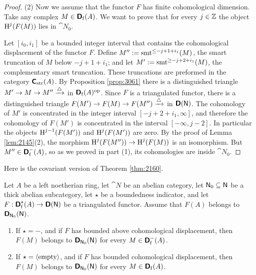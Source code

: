 \begin{proof}
\medskip \noindent
(2) Now we assume that the functor $F$ has finite cohomological dimension. Take 
any complex $M \in \boldsymbol{\mathsf{D}}_{\mathrm{f}}(A)$. We want to prove 
that for every $j \in \mathbb{Z}$ the object $\operatorname{H}^j(F(M))$ lies in $\cat{N}_0$. 

Let $[i_0, i_1]$ be a bounded integer interval that contains the 
cohomological displacement of the functor $F$. 
Define $M'' := \operatorname{smt}^{\leq - j + 1 + i_1}(M)$, the smart truncation of $M$ 
below $-j + 1 + i_1$; and let $M' := \operatorname{smt}^{\geq -j + 2 + i_1}(M)$, the 
complementary smart truncation. These truncations are preformed in the category 
$\boldsymbol{\mathsf{C}}_{\mathrm{str}}(A)$. 
By Proposition \ref{prop:3061} there is a distinguished triangle 
$M' \to M \to M'' \xrightarrow{\triangle}$ 
in $\boldsymbol{\mathsf{D}}_{\mathrm{f}}(A)^{\mathrm{op}}$.
Since $F$ is a triangulated functor, there is a distinguished triangle 
$F(M') \to F(M) \to F(M'') \xrightarrow{\triangle}$ 
in $\boldsymbol{\mathsf{D}}(\operatorname{\mathsf{N}})$.
The cohomology of $M'$ is concentrated in the integer
interval $[- j + 2 + i_1, \infty]$, and therefore the cohomology of 
$F(M')$ is concentrated in the interval $[- \infty, j - 2]$. 
In particular the objects $\operatorname{H}^{j - 1}(F(M'))$ and 
$\operatorname{H}^{j}(F(M'))$ are zero.
By the proof of Lemma \ref{lem:2145}(2), the morphism 
$\operatorname{H}^j(F(M'')) \to \operatorname{H}^j(F(M))$ is an isomorphism.
But $M'' \in \boldsymbol{\mathsf{D}}^-_{\mathrm{f}}(A)$, so as we proved in part (1), its 
cohomologies are inside $\cat{N}_0$. 
\end{proof}

Here is the covariant version of Theorem \ref{thm:2160}.

\begin{thm} \label{thm:4600} 
Let $A$ be a left noetherian ring, let $\cat{N}$ be an abelian category, let
$\operatorname{\mathsf{N}}_0 \subseteq \operatorname{\mathsf{N}}$ be a thick abelian subcategory, let $\star$ be a 
boundedness indicator, and let 
$F : \boldsymbol{\mathsf{D}}^{\star}_{\mathrm{f}}(A) \to \boldsymbol{\mathsf{D}}(\operatorname{\mathsf{N}})$
be a triangulated functor. Assume that 
$F(A)$ belongs to $\boldsymbol{\mathsf{D}}_{\operatorname{\mathsf{N}}_0}(\operatorname{\mathsf{N}})$.
\begin{enumerate}
\item If $\star = -$, and if $F$ has bounded above cohomological displacement, 
then $F(M)$ belongs to $\boldsymbol{\mathsf{D}}_{\operatorname{\mathsf{N}}_0}(\operatorname{\mathsf{N}})$
for every $M \in \boldsymbol{\mathsf{D}}^-_{\mathrm{f}}(A)$.

\item If $\star = \langle \mathrm{empty} \rangle$, and if $F$ has bounded cohomological 
displacement, then $F(M)$ belongs to $\boldsymbol{\mathsf{D}}_{\operatorname{\mathsf{N}}_0}(\operatorname{\mathsf{N}})$
for every $M \in \boldsymbol{\mathsf{D}}_{\mathrm{f}}(A)$.
\end{enumerate} 
\end{thm}

